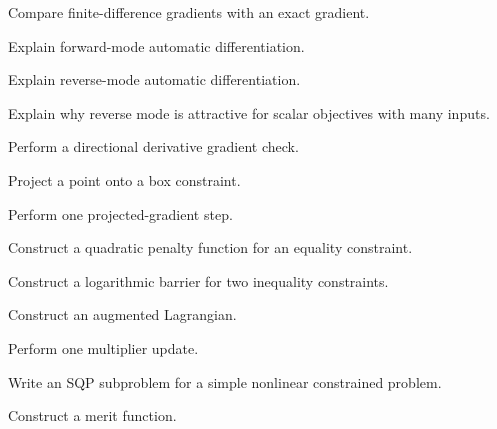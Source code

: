 \begin{exercise}[3]
Compare finite-difference gradients with an exact gradient.
\end{exercise}

\begin{exercise}[3]
Explain forward-mode automatic differentiation.
\end{exercise}

\begin{exercise}[3]
Explain reverse-mode automatic differentiation.
\end{exercise}

\begin{exercise}[3]
Explain why reverse mode is attractive for scalar objectives with many
inputs.
\end{exercise}

\begin{exercise}[3]
Perform a directional derivative gradient check.
\end{exercise}

\begin{exercise}[2]
Project a point onto a box constraint.
\end{exercise}

\begin{exercise}[3]
Perform one projected-gradient step.
\end{exercise}

\begin{exercise}[3]
Construct a quadratic penalty function for an equality constraint.
\end{exercise}

\begin{exercise}[3]
Construct a logarithmic barrier for two inequality constraints.
\end{exercise}

\begin{exercise}[3]
Construct an augmented Lagrangian.
\end{exercise}

\begin{exercise}[3]
Perform one multiplier update.
\end{exercise}

\begin{exercise}[3]
Write an SQP subproblem for a simple nonlinear constrained problem.
\end{exercise}

\begin{exercise}[3]
Construct a merit function.
\end{exercise}

